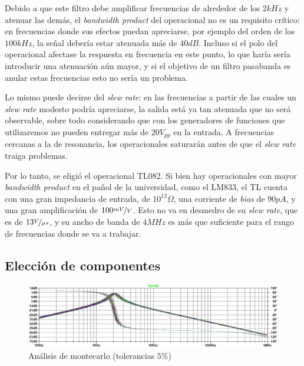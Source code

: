 \documentclass[../../tc_tp3_main.tex]{subfiles}
\begin{document}
Debido a que este filtro debe amplificar frecuencias de alrededor de los $2kHz$ y atenuar las dem\'as, el \textit{bandwidth product} del operacional no es un requisito cr\'itico: en frecuencias donde sus efectos puedan apreciarse, por ejemplo del orden de los $100kHz$, la se\~nal deber\'ia estar atenuada m\'as de $40dB$. Incluso si el polo del operacional afectase la respuesta en frecuencia en este punto, lo que har\'ia ser\'ia introducir una atenuaci\'on a\'un mayor, y si el objetivo de un filtro pasabanda es anular estas frecuencias esto no ser\'ia un problema. \par 

Lo mismo puede decirse del \textit{slew rate}: en las frecuencias a partir de las cuales un \textit{slew rate} modesto podr\'ia apreciarse, la salida est\'a ya tan atenuada que no ser\'a observable, sobre todo considerando que con los generadores de funciones que utilizaremos no pueden entregar m\'as de $20V_{pp}$ en la entrada. A frecuencias cercanas a la de resonancia, los operacionales saturar\'an antes de que el \textit{slew rate} traiga problemas.\par

Por lo tanto, se eligi\'o el operacional TL082. Si bien hay operacionales con mayor \textit{bandwidth product} en el pa\~nol de la universidad, como el LM833, el TL cuenta con una gran impedancia de entrada, de $10^{12}\Omega$, una corriente de \textit{bias} de $90pA$, y una gran amplificaci\'on de $100\nicefrac{mV}{V}$. Esto no va en desmedro de su \textit{slew rate}, que es de $13\nicefrac{V}{\mu s}$, y su ancho de banda de $4MHz$ es m\'as que suficiente para el rango de frecuencias donde se va a trabajar.


\subsection{Elecci\'on de componentes}

\begin{figure}[t]
	\centering
  \includegraphics[scale = 0.7]{imagenes/ej1-montecarlo.jpg}
  \caption{An\'alisis de montecarlo (tolerancias $5\%$)}
  \label{fig:1-montecarlo}
\end{figure}
\end{document}
